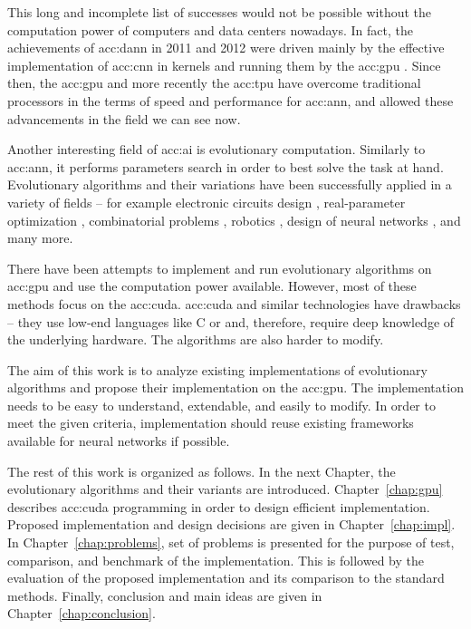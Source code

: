 This long and incomplete list of successes would not be possible without the computation power of computers and data centers nowadays. In fact, the achievements of \acrshort{acc:dann} in 2011 and 2012 were driven mainly by the effective implementation of \acrfull{acc:cnn} in kernels and running them by the \acrfull{acc:gpu} \citep{CIRESAN2012333}. Since then, the \acrshort{acc:gpu} and more recently the \acrfull{acc:tpu} have overcome traditional processors in the terms of speed and performance for \acrshort{acc:ann}, and allowed these advancements in the field we can see now.

Another interesting field of \acrlong{acc:ai} is evolutionary computation. Similarly to \acrshort{acc:ann}, it performs parameters search in order to best solve the task at hand. Evolutionary algorithms and their variations have been successfully applied in a variety of fields -- for example 
electronic circuits design \citep{NASAantenaDesign}\allowbreak\citep{circuitdesignoptimizationea},
real-parameter optimization \citep{IntroNaturalEvolutionStrategies}, 
combinatorial problems \citep{GeneticAssambleLineBalancingProblem}\allowbreak\citep{ALBAYRAK20111313},\linebreak
robotics \citep{RoboticsInPhysX}\allowbreak\citep{EvolutionaryRobotics}\allowbreak\citep{nygaard2018realworld},
design of neural networks \citep{NEAT}\allowbreak\citep{Floreano2008NeuroevolutionFA},
and many more.

There have been attempts to implement and run evolutionary algorithms on \acrshort{acc:gpu} \citep{CHENG2019514} and use the computation power available. However, most of these methods focus on the \acrfull{acc:cuda}. \acrshort{acc:cuda} and similar technologies have drawbacks -- they use low-end languages like C or \cpp and, therefore, require deep knowledge of the underlying hardware. The algorithms are also harder to modify.

The aim of this work is to analyze existing implementations of evolutionary algorithms and propose their implementation on the \acrshort{acc:gpu}. The implementation needs to be easy to understand, extendable, and easily to modify. In order to meet the given criteria, implementation should reuse existing frameworks available for neural networks if possible.

The rest of this work is organized as follows. 
In the next Chapter, the evolutionary algorithms and their variants are introduced. 
Chapter~\ref{chap:gpu} describes \acrshort{acc:cuda} programming in order to  design efficient implementation.
Proposed implementation and design decisions are given in Chapter~\ref{chap:impl}. 
In Chapter~\ref{chap:problems}, set of problems is presented for the purpose of test, comparison, and benchmark of the implementation. This is followed by the evaluation of the proposed implementation and its comparison to the standard methods.
Finally, conclusion and main ideas are given in Chapter~\ref{chap:conclusion}.
